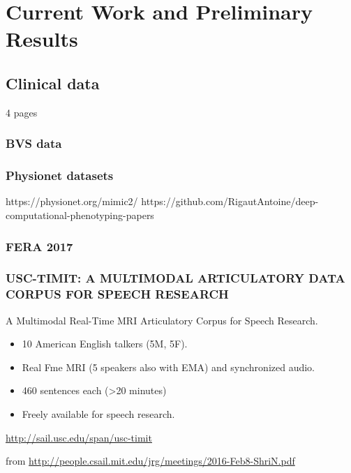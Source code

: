 \chapter{Current Work and Preliminary Results}
\label{cha:currentWork}

\section{Clinical data}

4 pages

\subsection{BVS data}

\subsection{Physionet datasets}


https://physionet.org/mimic2/
https://github.com/RigautAntoine/deep-computational-phenotyping-papers

\subsection{FERA 2017}


\subsection{USC-TIMIT: A MULTIMODAL ARTICULATORY DATA CORPUS FOR SPEECH RESEARCH}

A Multimodal Real-Time MRI Articulatory Corpus for Speech Research.
\begin{itemize}
    \item 10 American English talkers (5M, 5F).
    \item Real Fme MRI (5 speakers also with EMA)
and synchronized audio.
    \item 460 sentences each (>20 minutes)
    \item Freely available for speech research.
\end{itemize}


\url{http://sail.usc.edu/span/usc-timit}

from \url{http://people.csail.mit.edu/jrg/meetings/2016-Feb8-ShriN.pdf}\\

